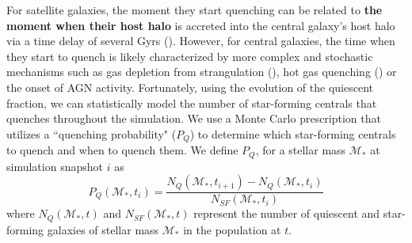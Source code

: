 \documentclass[iop,apj,tighten,twocolappendix,numberedappendix]{emulateapj}
\newcommand{\beq}{\begin{equation}}
\newcommand{\eeq}{\end{equation}}
\begin{document}
For satellite galaxies, the moment they start quenching can be
related to {\color{red} \bf the moment when their host halo} is accreted 
into the central galaxy's host halo via a time delay of 
several Gyrs (\citealt{Wetzel:2013aa}). 
However, for central galaxies, the time when they start to 
quench is likely characterized by more complex and stochastic 
mechanisms such as gas depletion from strangulation (\citealt{Peng:2015aa}), 
hot gas quenching (\citealt{Gabor:2010aa,Gabor:2012aa,Gabor:2015aa}) or 
the onset of AGN activity. Fortunately, using the evolution of the quiescent fraction, 
we can statistically model the number of star-forming centrals 
that quenches throughout the simulation. We use a Monte Carlo 
prescription that utilizes a ``quenching probability" ($P_Q$) 
to determine which star-forming centrals to quench and when to 
quench them. 
We define $P_Q$, for a stellar mass $\mathcal{M}_*$ at simulation snapshot $i$ as  
\beq \label{eq:pq}
P_Q(\mathcal{M}_*, t_i) = 
\frac{N_Q(\mathcal{M}_*, t_{i+1}) - N_Q(\mathcal{M}_*, t_i)}{N_{SF}(\mathcal{M}_*, t_i)}
\eeq
where $N_Q(\mathcal{M}_*, t)$ and $N_{SF}(\mathcal{M}_*, t)$ 
represent the number of quiescent and star-forming galaxies of 
stellar mass $\mathcal{M}_*$ in the population at $t$. 
\end{document}
